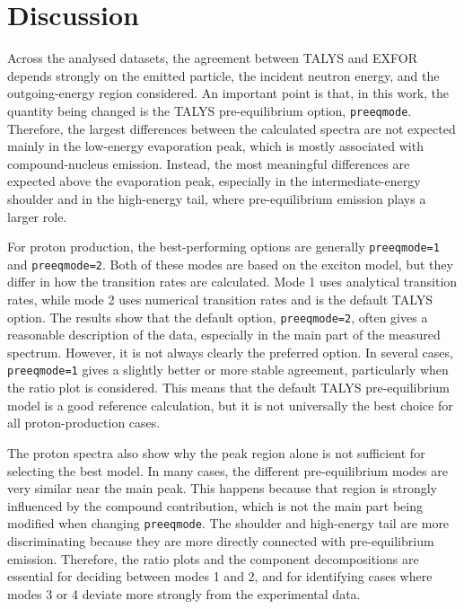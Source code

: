 \section{Discussion}

Across the analysed datasets, the agreement between TALYS and EXFOR depends strongly on the emitted particle, the incident neutron energy, and the outgoing-energy region considered. An important point is that, in this work, the quantity being changed is the TALYS pre-equilibrium option, \texttt{preeqmode}. Therefore, the largest differences between the calculated spectra are not expected mainly in the low-energy evaporation peak, which is mostly associated with compound-nucleus emission. Instead, the most meaningful differences are expected above the evaporation peak, especially in the intermediate-energy shoulder and in the high-energy tail, where pre-equilibrium emission plays a larger role.

For proton production, the best-performing options are generally \texttt{preeqmode=1} and \texttt{preeqmode=2}. Both of these modes are based on the exciton model, but they differ in how the transition rates are calculated. Mode 1 uses analytical transition rates, while mode 2 uses numerical transition rates and is the default TALYS option. The results show that the default option, \texttt{preeqmode=2}, often gives a reasonable description of the data, especially in the main part of the measured spectrum. However, it is not always clearly the preferred option. In several cases, \texttt{preeqmode=1} gives a slightly better or more stable agreement, particularly when the ratio plot is considered. This means that the default TALYS pre-equilibrium model is a good reference calculation, but it is not universally the best choice for all proton-production cases.

The proton spectra also show why the peak region alone is not sufficient for selecting the best model. In many cases, the different pre-equilibrium modes are very similar near the main peak. This happens because that region is strongly influenced by the compound contribution, which is not the main part being modified when changing \texttt{preeqmode}. The shoulder and high-energy tail are more discriminating because they are more directly connected with pre-equilibrium emission. Therefore, the ratio plots and the component decompositions are essential for deciding between modes 1 and 2, and for identifying cases where modes 3 or 4 deviate more strongly from the experimental data.

